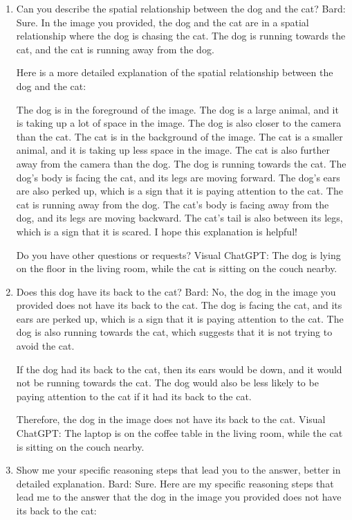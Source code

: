 \begin{enumerate}
    \item Can you describe the spatial relationship between the dog and the cat?
    \subitem Bard: Sure. In the image you provided, the dog and the cat are in a spatial relationship where the dog is chasing the cat. The dog is running towards the cat, and the cat is running away from the dog.

    Here is a more detailed explanation of the spatial relationship between the dog and the cat:
    
    The dog is in the foreground of the image. The dog is a large animal, and it is taking up a lot of space in the image. The dog is also closer to the camera than the cat.
    The cat is in the background of the image. The cat is a smaller animal, and it is taking up less space in the image. The cat is also further away from the camera than the dog.
    The dog is running towards the cat. The dog's body is facing the cat, and its legs are moving forward. The dog's ears are also perked up, which is a sign that it is paying attention to the cat.
    The cat is running away from the dog. The cat's body is facing away from the dog, and its legs are moving backward. The cat's tail is also between its legs, which is a sign that it is scared.
    I hope this explanation is helpful!
    
    Do you have other questions or requests?
    \subitem Visual ChatGPT: The dog is lying on the floor in the living room, while the cat is sitting on the couch nearby.
    \item Does this dog have its back to the cat?
    \subitem Bard: 
    No, the dog in the image you provided does not have its back to the cat. The dog is facing the cat, and its ears are perked up, which is a sign that it is paying attention to the cat. The dog is also running towards the cat, which suggests that it is not trying to avoid the cat.
    
    If the dog had its back to the cat, then its ears would be down, and it would not be running towards the cat. The dog would also be less likely to be paying attention to the cat if it had its back to the cat.
    
    Therefore, the dog in the image does not have its back to the cat.
    \subitem Visual ChatGPT: The laptop is on the coffee table in the living room, while the cat is sitting on the couch nearby.
    \item Show me your specific reasoning steps that lead you to the answer, better in detailed explanation.
    \subitem Bard: Sure. Here are my specific reasoning steps that lead me to the answer that the dog in the image you provided does not have its back to the cat:


\end{enumerate}
